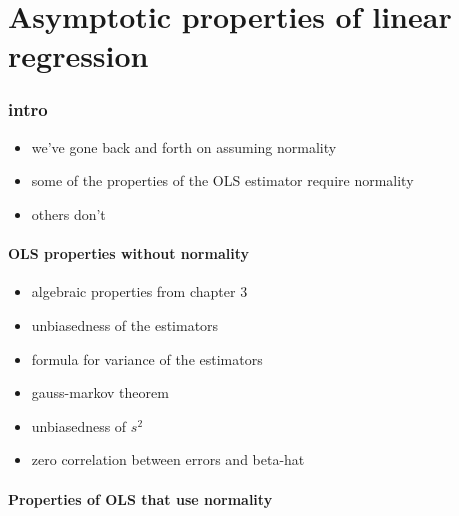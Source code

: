 

\part*{Asymptotic properties of linear regression}%

\section{intro}

\begin{itemize}
\item we've gone back and forth on assuming normality
\item some of the properties of the OLS estimator require normality
\item others don't
\end{itemize}

\subsection{OLS properties without normality}

\begin{itemize}
\item algebraic properties from chapter 3
\item unbiasedness of the estimators
\item formula for variance of the estimators
\item gauss-markov theorem
\item unbiasedness of $s^2$
\item zero correlation between errors and beta-hat
\end{itemize}

\subsection{Properties of OLS that use normality}

